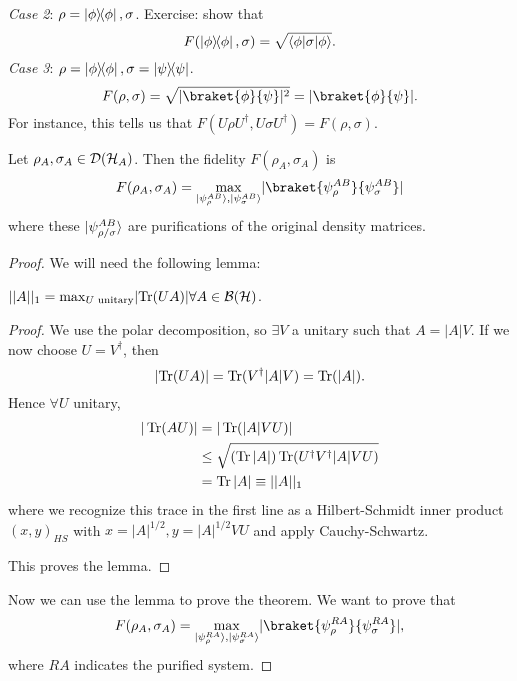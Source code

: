 \textit{Case 2}: $\rho=\left\lvert{\phi}\middle\rangle\!\middle\langle{\phi}\right\rvert,\sigma$. Exercise: show that
\begin{equation}
    F(\left\lvert{\phi}\middle\rangle\!\middle\langle{\phi}\right\rvert,\sigma)=\sqrt{\langle\phi\rvert\sigma \lvert\phi\rangle}.
\end{equation}
\textit{Case 3}: $\rho=\left\lvert{\phi}\middle\rangle\!\middle\langle{\phi}\right\rvert,\sigma = \left\lvert{\psi}\middle\rangle\!\middle\langle{\psi}\right\rvert$.
\begin{equation}
    F(\rho,\sigma)=\sqrt{\abs{\braket{\phi}{\psi}}^2} =\abs{\braket{\phi}{\psi}}.
\end{equation}
For instance, this tells us that $F(U\rho U^\dagger, U\sigma U^\dagger)=F(\rho,\sigma)$.

\begin{thm}[Uhlmann]
    Let $\rho_A, \sigma_A \in \mathcal{D}(\mathcal H_A)$. Then the fidelity $F(\rho_A,\sigma_A)$ is
    \begin{equation}
        F(\rho_A,\sigma_A) =\max_{\ket{\psi_\rho^{AB}},\ket{\psi_\sigma^{AB}}} \abs{\braket{\psi_\rho^{AB}}{\psi_\sigma^{AB}}}
    \end{equation}
    where these $\lvert\psi_{\rho/\sigma}^{AB}\rangle$ are purifications of the original density matrices.
    \begin{proof}
        We will need the following lemma:
        \begin{lem}
            $||A||_1 = \max_{U\text{ unitary}} \lvert\operatorname{Tr}(UA)\rvert \forall A \in \mathcal{B}(\mathcal H)$.
        \end{lem}
        \begin{proof}
            We use the polar decomposition, so $\exists V$ a unitary such that $A=|A|V$. If we now choose $U=V^\dagger$, then
            \begin{equation*} 
                \lvert\operatorname{Tr}(UA)\rvert=\operatorname{Tr}(V^\dagger |A|V)=\operatorname{Tr}(|A|).
            \end{equation*}
            Hence $\forall U$ unitary,
            \begin{align*}
                |\operatorname{Tr}(AU)| &= |\operatorname{Tr}(|A|V U)|\\
                    &\leq \sqrt{(\operatorname{Tr}|A|)\operatorname{Tr}(U^\dagger V^\dagger |A| VU)}\\
                    &=\operatorname{Tr}|A|\equiv ||A||_1
            \end{align*}
            where we recognize this trace in the first line as a Hilbert-Schmidt inner product $(x,y)_{HS}$ with $x=|A|^{1/2},y=|A|^{1/2}VU$ and apply Cauchy-Schwartz.
            
            This proves the lemma.
        \end{proof}
        Now we can use the lemma to prove the theorem. We want to prove that 
        \begin{equation*}
            F(\rho_A,\sigma_A)=\max_{\ket{\psi_\rho^{RA}},\ket{\psi_\sigma^{RA}}} \abs{\braket{\psi_\rho^{RA}}{\psi_\sigma^{RA}}},
        \end{equation*}
        where $RA$ indicates the purified system.
        

\end{proof}
\end{thm}
